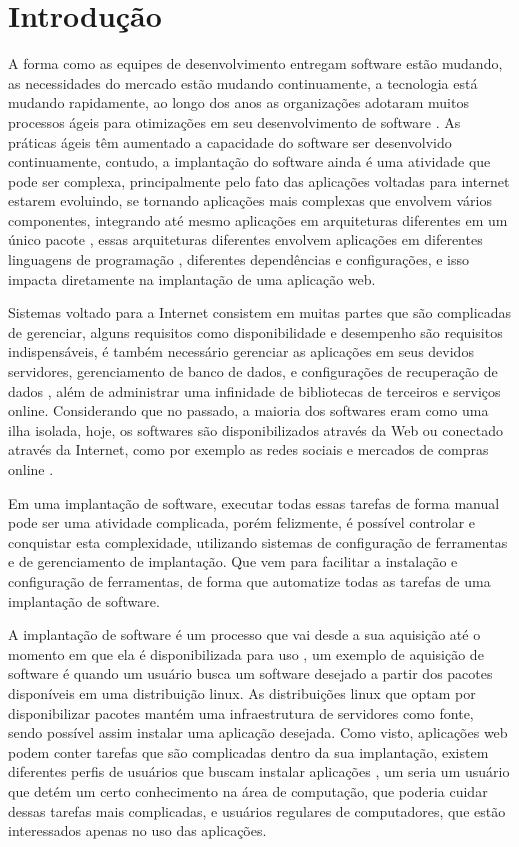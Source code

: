 \chapter{Introdução}
\label{cap-introducao}

A forma como as equipes de desenvolvimento entregam software estão mudando, as
necessidades do mercado estão mudando continuamente, a tecnologia está mudando
rapidamente, ao longo dos anos as organizações adotaram muitos processos ágeis para
otimizações em seu desenvolvimento de software \cite{7173368}. As práticas ágeis
têm aumentado a capacidade do software ser desenvolvido continuamente, contudo,
a implantação do software ainda é uma atividade que pode ser complexa, principalmente
pelo fato das aplicações voltadas para internet estarem evoluindo, se tornando
aplicações mais complexas que envolvem vários componentes, integrando até mesmo
aplicações em arquiteturas diferentes em um único pacote \cite{6265084}, essas
arquiteturas diferentes envolvem aplicações em diferentes linguagens de programação
, diferentes dependências e configurações, e isso impacta diretamente na implantação
 de uma aplicação web.

Sistemas voltado para a Internet consistem em muitas partes que são complicadas
de gerenciar, alguns requisitos como disponibilidade e desempenho são requisitos
indispensáveis, é também necessário gerenciar as aplicações em seus devidos
servidores, gerenciamento de banco de dados, e configurações de recuperação de dados
, além de administrar uma infinidade de bibliotecas de terceiros e serviços online.
 Considerando que no passado, a maioria dos softwares eram como uma ilha isolada,
hoje, os softwares são disponibilizados através da Web ou conectado através da Internet,
como por exemplo as redes sociais e mercados de compras online \cite{6265084}.

Em uma implantação de software, executar todas essas tarefas de forma manual pode ser
uma atividade complicada, porém felizmente, é possível controlar e conquistar
esta complexidade, utilizando sistemas de configuração de ferramentas e de
gerenciamento de implantação. Que vem para facilitar a instalação e configuração de ferramentas,
de forma que automatize todas as tarefas de uma implantação de software.

A implantação de software é um processo que vai desde a sua aquisição até o momento
em que ela é disponibilizada para uso \cite{OMG06}, um exemplo de aquisição de software
é quando um usuário busca um software desejado a partir dos pacotes disponíveis em uma
distribuição linux. As distribuições linux que optam por disponibilizar
pacotes mantém uma infraestrutura de servidores como fonte, sendo possível assim
instalar uma aplicação desejada. Como visto, aplicações web podem conter tarefas
que são complicadas dentro da sua implantação, existem diferentes perfis de
usuários que buscam instalar aplicações \cite{araujo2011apprecommender}, um seria
um usuário que detém um certo conhecimento na área de computação, que poderia
cuidar dessas tarefas mais complicadas, e usuários regulares de computadores,
que estão interessados apenas no uso das aplicações.

